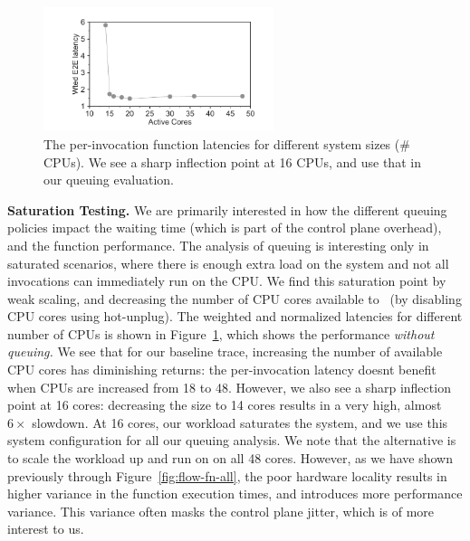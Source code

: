 \begin{figure}
  \centering 
  \includegraphics[width=0.6\textwidth]{iluvatar/graphs/scaling/WeakScaling.pdf}
  \caption{The per-invocation function latencies for different system sizes (\# CPUs). We see a sharp inflection point at 16 CPUs, and use that in our queuing evaluation.}
  \label{fig:weak}
\end{figure}


\noindent \textbf{Saturation Testing.}
We are primarily interested in how the different queuing policies impact the waiting time (which is part of the control plane overhead), and the function performance.
The analysis of queuing is interesting only in saturated scenarios, where there is enough extra load on the system and not all invocations can immediately run on the CPU.
We find this saturation point by weak scaling, and decreasing the number of CPU cores available to \sysname~(by disabling CPU cores using hot-unplug). 
The weighted and normalized latencies for different number of CPUs is shown in Figure~\ref{fig:weak}, which shows the performance \emph{without queuing.}
We see that for our baseline trace, increasing the number of available CPU cores has diminishing returns: the per-invocation latency doesnt benefit when CPUs are increased from 18 to 48.
However, we also see a sharp inflection point at 16 cores: decreasing the size to 14 cores results in a very high, almost $6\times$ slowdown. 
At 16 cores, our workload saturates the system, and we use this system configuration for all our queuing analysis.
We note that the alternative is to scale the workload up and run on on all 48 cores.
However, as we have shown previously through Figure~\ref{fig:flow-fn-all}, the poor hardware locality results in higher variance in the function execution times, and introduces more performance variance.
This variance often masks the control plane jitter, which is of more interest to us. 


